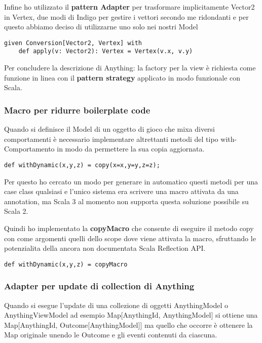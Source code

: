 Infine ho utilizzato il \textbf{pattern Adapter} per trasformare implicitamente Vector2 in Vertex, due modi di Indigo per gestire i vettori secondo me ridondanti e per questo abbiamo deciso di utilizzarne uno solo nei nostri Model
\begin{lstlisting}[basicstyle=\tiny]
given Conversion[Vector2, Vertex] with
    def apply(v: Vector2): Vertex = Vertex(v.x, v.y)
\end{lstlisting}

Per concludere la descrizione di Anything: la factory per la view è richiesta come funzione in linea con il \textbf{pattern strategy} applicato in modo funzionale con Scala.


\subsubsection{Macro per ridurre boilerplate code}
Quando si definisce il Model di un oggetto di gioco che mixa diversi comportamenti è necessario implementare altrettanti metodi del tipo with-Comportamento in modo da permettere la sua copia aggiornata. 

\begin{lstlisting}[basicstyle=\tiny]
def withDynamic(x,y,z) = copy(x=x,y=y,z=z); 
\end{lstlisting}

Per questo ho cercato un modo per generare in automatico questi metodi per una case class qualsiasi e l'unico sistema era scrivere una macro attivata da una annotation, ma Scala 3 al momento non supporta questa soluzione possibile su Scala 2.

Quindi ho implementato la \textbf{copyMacro} che consente di eseguire il metodo copy con come argomenti quelli dello scope dove viene attivata la macro, sfruttando le potenzialita della ancora non documentata Scala Reflection API. 

\begin{lstlisting}[basicstyle=\tiny]
def withDynamic(x,y,z) = copyMacro
\end{lstlisting}

\subsubsection{Adapter per update di collection di Anything}

Quando si esegue l'update di una collezione di oggetti AnythingModel o AnythingViewModel ad esempio Map[AnythingId, AnythingModel] si ottiene una Map[AnythingId, Outcome[AnythingModel]] ma quello che occorre è ottenere la Map originale unendo le Outcome e gli eventi contenuti da ciascuna.

